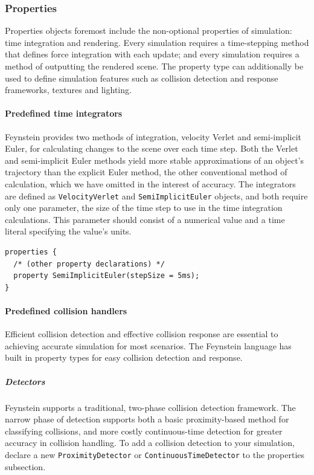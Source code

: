 \subsubsection{Properties}
Properties objects foremost include the non-optional properties of
simulation: time integration and rendering. Every simulation requires
a time-stepping method that defines force integration with each
update; and every simulation requires a method of outputting the
rendered scene. The property type can additionally be used to define
simulation features such as collision detection and response
frameworks, textures and lighting.

\paragraph{Predefined time integrators}

Feynstein provides two methods of integration, velocity Verlet and
semi-implicit Euler, for calculating changes to the scene over each
time step. Both the Verlet and semi-implicit Euler methods yield
more stable approximations of an object's trajectory than the explicit
Euler method, the other conventional method of calculation, which we
have omitted in the interest of accuracy. The integrators are defined
as \texttt{VelocityVerlet} and \texttt{SemiImplicitEuler} objects, and both require
only one parameter, the size of the time step to use in the time
integration calculations. This parameter should consist of a numerical
value and a time literal specifying the value's units.

\begin{verbatim}
properties {
  /* (other property declarations) */
  property SemiImplicitEuler(stepSize = 5ms);
}
\end{verbatim}

\paragraph{Predefined collision handlers}
Efficient collision detection and effective collision response are
essential to achieving accurate simulation for most scenarios. The
Feynstein language has built in property types for easy collision
detection and response.

\subparagraph{Detectors}

Feynstein supports a traditional, two-phase collision detection
framework. The narrow phase of detection supports both a basic proximity-based
method for classifying collisions, and more costly continuous-time detection for greater accuracy in
collision handling. To add a collision detection to your simulation, declare a
new \texttt{ProximityDetector} or \texttt{ContinuousTimeDetector} to the properties subsection. 

